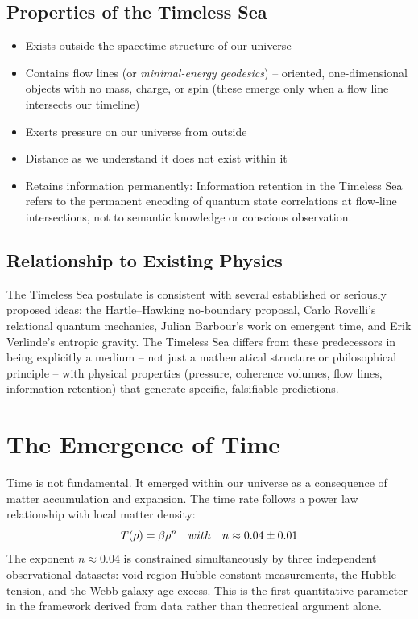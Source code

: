 \documentclass[11pt,a4paper]{article}
\let\text\relax \let\mathrm\relax \let\mathbf\relax \let\mathcal\relax
\begin{document}
\subsection{Properties of the Timeless Sea}
\begin{itemize}
    \item Exists outside the spacetime structure of our universe
    \item Contains flow lines (or \textit{minimal-energy geodesics}) -- oriented, one-dimensional objects with no mass, charge, or spin (these emerge only when a flow line intersects our timeline)
    \item Exerts pressure on our universe from outside
    \item Distance as we understand it does not exist within it
    \item Retains information permanently: Information retention in the Timeless Sea refers to the permanent encoding of quantum state correlations at flow-line intersections, not to semantic knowledge or conscious observation.
\end{itemize}

\subsection{Relationship to Existing Physics}
The Timeless Sea postulate is consistent with several established or seriously proposed ideas: the Hartle--Hawking no-boundary proposal, Carlo Rovelli's relational quantum mechanics, Julian Barbour's work on emergent time, and Erik Verlinde's entropic gravity. The Timeless Sea differs from these predecessors in being explicitly a medium -- not just a mathematical structure or philosophical principle -- with physical properties (pressure, coherence volumes, flow lines, information retention) that generate specific, falsifiable predictions.

\section{The Emergence of Time}
Time is not fundamental. It emerged within our universe as a consequence of matter accumulation and expansion. The time rate follows a power law relationship with local matter density:
\begin{equation}
T(\rho) = \beta \rho^n \quad \text{with} \quad n \approx 0.04 \pm 0.01
\end{equation}
The exponent $n \approx 0.04$ is constrained simultaneously by three independent observational datasets: void region Hubble constant measurements, the Hubble tension, and the Webb galaxy age excess. This is the first quantitative parameter in the framework derived from data rather than theoretical argument alone.
\end{document}
